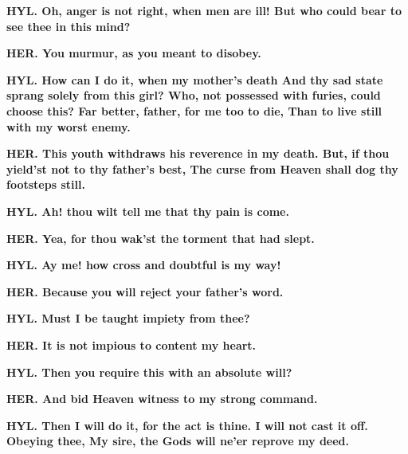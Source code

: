 \documentclass[11pt,letter]{book}
\begin{document}
\par \textbf{HYL. Oh, anger is not right, when men are ill! But who could bear to see thee in this mind?}
\par 

\par \textbf{HER. You murmur, as you meant to disobey.}
\par 

\par \textbf{HYL. How can I do it, when my mother’s death And thy sad state sprang solely from this girl? Who, not possessed with furies, could choose this? Far better, father, for me too to die, Than to live still with my worst enemy.}
\par 

\par \textbf{HER. This youth withdraws his reverence in my death. But, if thou yield’st not to thy father’s best, The curse from Heaven shall dog thy footsteps still.}
\par 

\par \textbf{HYL. Ah! thou wilt tell me that thy pain is come.}
\par 

\par \textbf{HER. Yea, for thou wak’st the torment that had slept.}
\par 

\par \textbf{HYL. Ay me! how cross and doubtful is my way!}
\par 

\par \textbf{HER. Because you will reject your father’s word.}
\par 

\par \textbf{HYL. Must I be taught impiety from thee?}
\par 

\par \textbf{HER. It is not impious to content my heart.}
\par 

\par \textbf{HYL. Then you require this with an absolute will?}
\par 

\par \textbf{HER. And bid Heaven witness to my strong command.}
\par 

\par \textbf{HYL. Then I will do it, for the act is thine. I will not cast it off. Obeying thee, My sire, the Gods will ne’er reprove my deed.}
\par 
\end{document}
